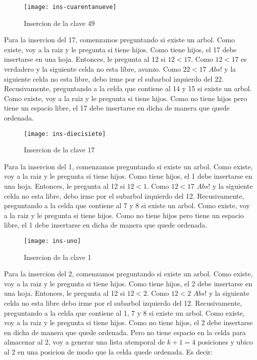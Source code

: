 \documentclass[10pt,a4paper]{article}
\begin{document}
\begin{figure}[h]
\centering
\texttt{[image: ins-cuarentanueve]}
\caption{Insercion de la clave 49}
\label{drivers1}
\end{figure}
\newpage

Para la insercion del 17, comenzamos preguntando si existe un arbol. Como existe, voy a la raiz y le pregunta si tiene hijos. Como tiene hijos, el 17 debe insertarse en una hoja. Entonces, le pregunta al 12 si $12 < 17$.
\newline
\newline
Como $12 < 17$ es verdadero y la siguiente celda no esta libre, avanzo. Como $22 < 17$ $Abs!$ y la siguiente celda no esta libre, debo irme por el subarbol izquierdo del 22. Recusivamente, preguntando a la celda que contiene al 14 y 15 si existe un arbol. Como existe, voy a la raiz y le pregunta si tiene hijos. Como no tiene hijos pero tiene un espacio libre, el 17 debe insertarse en dicha de manera que quede ordenada.

\begin{figure}[h]
\centering
\texttt{[image: ins-diecisiete]}
\caption{Insercion de la clave 17}
\label{drivers1}
\end{figure}

Para la insercion del 1, comenzamos preguntando si existe un arbol. Como existe, voy a la raiz y le pregunta si tiene hijos. Como tiene hijos, el 1 debe insertarse en una hoja. Entonces, le pregunta al 12 si $12 < 1$.
\newline
\newline
Como $12 < 17$ $Abs!$ y la siguiente celda no esta libre, debo irme por el subarbol izquierdo del 12. Recusivamente, preguntando a la celda que contiene al 7 y 8 si existe un arbol. Como existe, voy a la raiz y le pregunta si tiene hijos. Como no tiene hijos pero tiene un espacio libre, el 1 debe insertarse en dicha de manera que quede ordenada.

\begin{figure}[h]
\centering
\texttt{[image: ins-uno]}
\caption{Insercion de la clave 1}
\label{drivers1}
\end{figure}

Para la insercion del 2, comenzamos preguntando si existe un arbol. Como existe, voy a la raiz y le pregunta si tiene hijos. Como tiene hijos, el 2 debe insertarse en una hoja. Entonces, le pregunta al 12 si $12 < 2$.
\newline
\newline
Como $12 < 2$ $Abs!$ y la siguiente celda no esta libre debo irme por el subarbol izquierdo del 12. Recusivamente, preguntando a la celda que contiene al 1, 7 y 8 si existe un arbol. Como existe, voy a la raiz y le pregunta si tiene hijos. Como no tiene hijos, el 2 debe insertarse en dicha de manera que quede ordenada. Pero no tiene espacio en la celda para almacenar al 2, voy a generar una lista atemporal de $k+1 = 4$ posiciones y ubico al 2 en una posicion de modo que la celda quede ordenada. Es decir:
\end{document}
